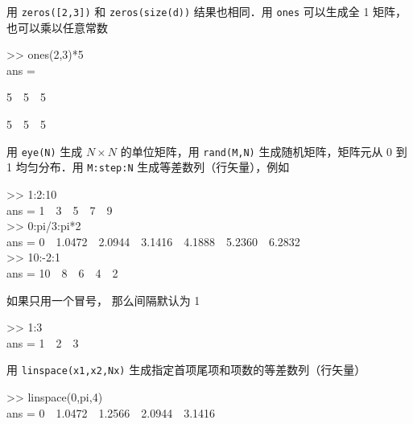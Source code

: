 用 \texttt{zeros([2,3])} 和 \texttt{zeros(size(d))} 结果也相同．用 \texttt{ones} 可以生成全 1 矩阵，也可以乘以任意常数
\begin{Command}
>> ones(2,3)*5 \\
ans = \par
5\ \ 5\ \ 5 \par
5\ \ 5\ \ 5
\end{Command}
用 \texttt{eye(N)} 生成 $N\times N$ 的单位矩阵，用 \texttt{rand(M,N)} 生成随机矩阵，矩阵元从 0 到 1 均匀分布．用 \texttt{M:step:N} 生成等差数列（行矢量），例如
\begin{Command}
>> 1:2:10 \\
ans = 1\ \ 3\ \ 5\ \ 7\ \ 9 \\
>> 0:pi/3:pi*2 \\
ans = 0\ \ 1.0472\ \ 2.0944\ \ 3.1416\ \ 4.1888\ \ 5.2360\ \ 6.2832 \\
>> 10:-2:1 \\
ans = 10\ \ 8\ \ 6\ \ 4\ \ 2
\end{Command}
如果只用一个冒号， 那么间隔默认为 1
\begin{Command}
>> 1:3 \\
ans = 1\ \ 2\ \ 3
\end{Command}
用 \texttt{linspace(x1,x2,Nx)} 生成指定首项尾项和项数的等差数列（行矢量）
\begin{Command}
>> linspace(0,pi,4) \\
ans = 0\ \ 1.0472\ \ 1.2566\ \ 2.0944\ \ 3.1416
\end{Command}

